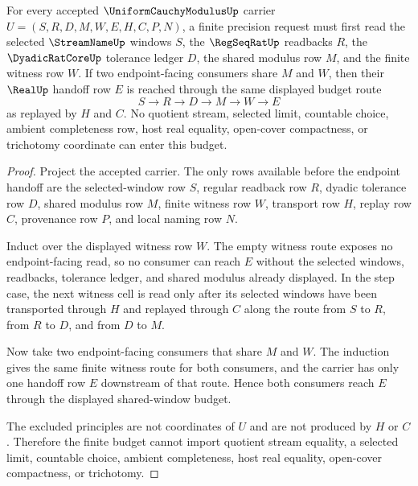 \begin{theorem}\label{thm:uniform-cauchy-modulus-shared-window-budget}
For every accepted $\UniformCauchyModulusUp$ carrier $U=(S,R,D,M,W,E,H,C,P,N)$, a finite precision request must first read the selected $\StreamNameUp$ windows $S$, the $\RegSeqRatUp$ readbacks $R$, the $\DyadicRatCoreUp$ tolerance ledger $D$, the shared modulus row $M$, and the finite witness row $W$. If two endpoint-facing consumers share $M$ and $W$, then their $\RealUp$ handoff row $E$ is reached through the same displayed budget route
$$
S \longrightarrow R \longrightarrow D \longrightarrow M \longrightarrow W \longrightarrow E
$$
as replayed by $H$ and $C$. No quotient stream, selected limit, countable choice, ambient completeness row, host real equality, open-cover compactness, or trichotomy coordinate can enter this budget.
\end{theorem}
\begin{proof}
Project the accepted carrier. The only rows available before the endpoint handoff are the selected-window row $S$, regular readback row $R$, dyadic tolerance row $D$, shared modulus row $M$, finite witness row $W$, transport row $H$, replay row $C$, provenance row $P$, and local naming row $N$.

Induct over the displayed witness row $W$. The empty witness route exposes no endpoint-facing read, so no consumer can reach $E$ without the selected windows, readbacks, tolerance ledger, and shared modulus already displayed. In the step case, the next witness cell is read only after its selected windows have been transported through $H$ and replayed through $C$ along the route from $S$ to $R$, from $R$ to $D$, and from $D$ to $M$.

Now take two endpoint-facing consumers that share $M$ and $W$. The induction gives the same finite witness route for both consumers, and the carrier has only one handoff row $E$ downstream of that route. Hence both consumers reach $E$ through the displayed shared-window budget.

The excluded principles are not coordinates of $U$ and are not produced by $H$ or $C$. Therefore the finite budget cannot import quotient stream equality, a selected limit, countable choice, ambient completeness, host real equality, open-cover compactness, or trichotomy.
\end{proof}

